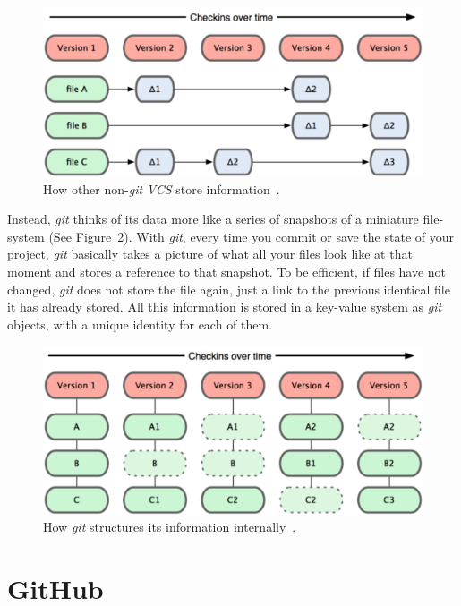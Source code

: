 \documentclass[a4paper, 12pt]{book}
\begin{document}
\begin{figure}
  \centering
  \includegraphics[width=12cm, keepaspectratio]{img/deltas-not-git}
  \caption{How other non-\emph{git} \emph{VCS} store information~\cite{progit2014book}.}
  \label{fig:info-not-git}
\end{figure}

Instead, \emph{git} thinks of its data more like a series of snapshots of a miniature file-system (See Figure~\ref{fig:info-git}).
With \emph{git}, every time you commit or save the state of your project, \emph{git} basically takes a picture of what all
your files look like at that moment and stores a reference to that snapshot. To be efficient, if files have not changed,
\emph{git} does not store the file again, just a link to the previous identical file it has already stored.
All this information is stored in a key-value system as \emph{git} objects, with a unique identity for each of them.

\begin{figure}
  \centering
  \includegraphics[width=12cm, keepaspectratio]{img/snapshots-git}
  \caption{How \emph{git} structures its information internally~\cite{progit2014book}.}
  \label{fig:info-git}
\end{figure}
\section{GitHub}
\label{sec:github}
\end{document}
